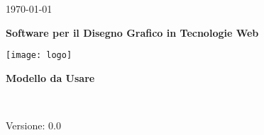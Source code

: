 
\title{\TITOLODOC}
\author{Piero Bizzotto}



\renewcommand{\insertversion}{0.0} %
\renewcommand{\TITOLODOC}{Modello da Usare} %
\renewcommand{\glosspath}{.\glossario} %

\begin{titlepage}
\begin{center}
	\begin{Large}	\today \end{Large}
\end{center}

\vspace{20pt}

\begin{center}
	\begin{Huge}
				\textbf{\ajax}
	\end{Huge}
\end{center}			

\begin{center}
	\begin{large}
				\textbf{Software per il Disegno Grafico in Tecnologie Web}
	\end{large}
\end{center}			

\vspace{20pt}

\begin{center}
\texttt{[image: logo]}
\end{center}

\vspace{170pt}
\begin{center} %
	\begin{Huge}
				\textbf{\TITOLODOC}
	\end{Huge}
			\\
\end{center}
\vspace{210pt}
\begin{center}
Versione: \insertversion
\end{center}
\end{titlepage}

\newpage

